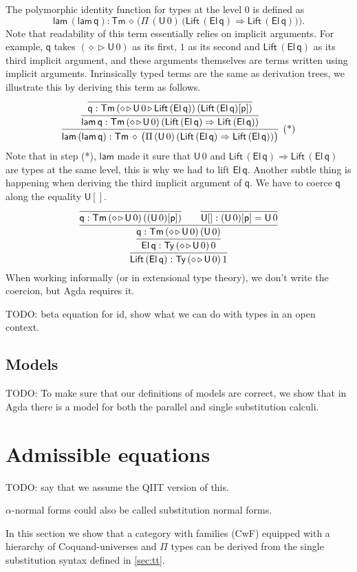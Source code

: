 \documentclass[sigplan,10pt,anonymous,review]{acmart}\settopmatter{printfolios=true,printccs=false,printacmref=false}
\newcommand{\Ra}{\Rightarrow}
\newcommand{\Ty}{\mathsf{Ty}}
\newcommand{\Tm}{\mathsf{Tm}}
\newcommand{\p}{\mathsf{p}}
\newcommand{\q}{\mathsf{q}}
\newcommand{\ext}{\mathop{\triangleright}}
\newcommand{\lam}{\mathsf{lam}}
\newcommand{\U}{\mathsf{U}}
\newcommand{\El}{\mathsf{El}}
\newcommand{\Lift}{\mathsf{Lift}}
\begin{document}
The polymorphic identity function for types at the level 0 is defined
as
\[
\lam\,(\lam\,\q) : \Tm\,\diamond\,\Big(\Pi\,(\U\,0)\,\big(\Lift\,(\El\,\q)\Ra\Lift\,(\El\,\q)\big)\Big).
\]
Note that readability of this term essentially relies on implicit
arguments. For example, $\q$ takes $(\diamond\ext\U\,0)$ as its first,
$1$ as its second and $\Lift\,(\El\,\q)$ as its third implicit
argument, and these arguments themselves are terms written using
implicit arguments. Inrinsically typed terms are the same as
derivation trees, we illustrate this by deriving this term as follows.
\[
\infer[\text{(*)}]{\lam\,(\lam\,\q) : \Tm\,\diamond\,\big(\Pi\,(\U\,0)\,(\Lift\,(\El\,\q)\Ra\Lift\,(\El\,\q))\big)}{\infer{\lam\,\q : \Tm\,(\diamond\ext\U\,0)\,(\Lift\,(\El\,\q)\Ra\Lift\,(\El\,\q))}{\infer{\q : \Tm\,(\diamond\ext\U\,0\ext\Lift\,(\El\,\q))\,(\Lift\,(\El\,\q)[\p])}{}}}
\]
Note that in step (*), $\lam$ made it sure that $\U\,0$ and
$\Lift\,(\El\,\q)\Ra\Lift\,(\El\,\q)$ are types at the same level,
this is why we had to lift $\El\,\q$. Another subtle thing is
happening when deriving the third implicit argument of $\q$. We have
to coerce $\q$ along the equality $\U[]$.
\[
\infer{\Lift\,(\El\,\q) : \Ty\,(\diamond\ext\U\,0)\,1}{\infer{\El\,\q : \Ty\,(\diamond\ext\U\,0)\,0}{\infer{\q : \Tm\,(\diamond\ext\U\,0)\,(\U\,0)}{\infer{\q : \Tm\,(\diamond\ext\U\,0)\,((\U\,0)[\p])}{} && \infer{\U[] : (\U\,0)[\p] = \U\,0}{}}}}
\]
When working informally (or in extensional type theory), we don't
write the coercion, but Agda requires it.

TODO: beta equation for id, show what we can do with types in an open
context.

\subsection{Models}

TODO: To make sure that our definitions of models are correct, we show
that in Agda there is a model for both the parallel and single
substitution calculi.

\section{Admissible equations}
\label{sec:admissible}

TODO: say that we assume the QIIT version of this.

$\alpha$-normal forms could also be called substitution normal forms.

In this section we show that a category with families (CwF) equipped
with a hierarchy of Coquand-universes and $\Pi$ types can be derived
from the single substitution syntax defined in \autoref{sec:tt}.
\end{document}
